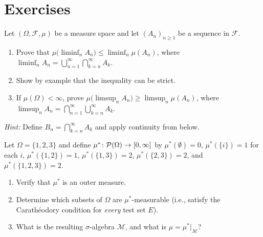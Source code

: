 \documentclass[11pt,a4paper]{article}
\begin{document}

\section{Exercises}
\label{sec:exercises}

\begin{exercise}
\label{ex:continuity}
Let $(\Omega, \mathcal{F}, \mu)$ be a measure space and let
$(A_n)_{n \geq 1}$ be a sequence in $\mathcal{F}$.
\begin{enumerate}[label=(\alph*)]
  \item Prove that
    $\mu\bigl(\liminf_{n} A_n\bigr) \leq
    \liminf_{n} \mu(A_n)$,
    where $\liminf_n A_n = \bigcup_{n=1}^\infty
    \bigcap_{k=n}^\infty A_k$.
  \item Show by example that the inequality can be strict.
  \item If $\mu(\Omega) < \infty$, prove
    $\mu\bigl(\limsup_{n} A_n\bigr) \geq
    \limsup_{n} \mu(A_n)$,
    where $\limsup_n A_n = \bigcap_{n=1}^\infty
    \bigcup_{k=n}^\infty A_k$.
\end{enumerate}
\textit{Hint:} Define $B_n = \bigcap_{k=n}^\infty A_k$ and apply
continuity from below.
\end{exercise}

\begin{exercise}
\label{ex:outer_measure}
Let $\Omega = \{1, 2, 3\}$ and define
$\mu^*\colon \mathcal{P}(\Omega) \to [0, \infty]$ by
$\mu^*(\emptyset) = 0$, $\mu^*(\{i\}) = 1$ for each $i$,
$\mu^*(\{1,2\}) = 1$, $\mu^*(\{1,3\}) = 2$, $\mu^*(\{2,3\}) = 2$,
and $\mu^*(\{1,2,3\}) = 2$.
\begin{enumerate}[label=(\alph*)]
  \item Verify that $\mu^*$ is an outer measure.
  \item Determine which subsets of $\Omega$ are
    $\mu^*$-measurable (i.e., satisfy the Carath\'{e}odory
    condition for \emph{every} test set $E$).
  \item What is the resulting $\sigma$-algebra $\mathcal{M}$, and what
    is $\mu = \mu^*|_{\mathcal{M}}$?
\end{enumerate}
\end{exercise}
\end{document}

